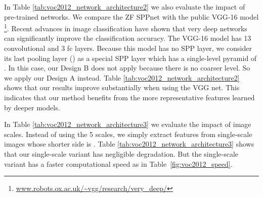 \documentclass[10pt,twocolumn,letterpaper]{article}
\begin{document}
In Table \ref{tab:voc2012_network_architecture2} we also evaluate the impact of pre-trained networks.
We compare the ZF SPPnet with the public VGG-16 model \cite{simonyan2014very}\footnote{\url{www.robots.ox.ac.uk/~vgg/research/very_deep/}}.
Recent advances in image classification have shown that very deep networks \cite{simonyan2014very} can significantly improve the classification accuracy. The VGG-16 model has 13 convolutional and 3 fc layers. Because this model has no SPP layer, we consider its last pooling layer () as a special SPP layer which has a single-level pyramid of . In this case, our Design B does not apply because there is no coarser level. So we apply our Design A instead. Table \ref{tab:voc2012_network_architecture2} shows that our results improve substantially when using the VGG net. This indicates that our method benefits from the more representative features learned by deeper models.

In Table \ref{tab:voc2012_network_architecture3} we evaluate the impact of image scales. Instead of using the 5 scales, we simply extract features from single-scale images whose shorter side is . Table \ref{tab:voc2012_network_architecture3} shows that our single-scale variant has negligible degradation. But the single-scale variant has a faster computational speed as in Table~\ref{fig:voc2012_speed}.
\end{document}
